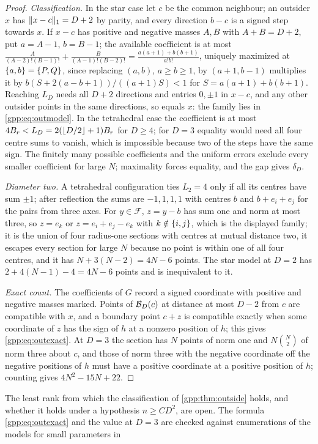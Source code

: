 \begin{proof}
\emph{Classification.} In the star case let $c$ be the common neighbour; an outsider $x$
has $\lVert x-c\rVert_1=D+2$ by parity, and every direction $b-c$ is a signed step towards $x$.
If $x-c$ has positive and negative masses $A,B$ with $A+B=D+2$, put $a=A-1$, $b=B-1$; the
available coefficient is at most $\frac A{(A-2)!(B-1)!}+\frac B{(A-1)!(B-2)!}
=\frac{a(a+1)+b(b+1)}{a!b!}$, uniquely maximized at $\{a,b\}=\{P,Q\}$, since replacing
$(a,b)$, $a\ge b\ge1$, by $(a+1,b-1)$ multiplies it by $b(S+2(a-b+1))/((a+1)S)<1$ for
$S=a(a+1)+b(b+1)$. Reaching $L_D$ needs all $D+2$ directions and entries $0,\pm1$ in $x-c$,
and any other outsider points in the same directions, so equals $x$: the family lies in
\eqref{gpp:eq:outmodel}. In the tetrahedral case the coefficient is at most
$4B_r<L_D=2(\lfloor D/2\rfloor+1)B_r$ for $D\ge4$; for $D=3$ equality would need all four centre
sums to vanish, which is impossible because two of the steps have the same sign. The finitely
many possible coefficients and the uniform errors exclude every smaller coefficient for
large $N$; maximality forces equality, and the gap gives $\delta_D$.

\emph{Diameter two.} A tetrahedral configuration ties $L_2=4$ only if all its centres have
sum $\pm1$; after reflection the sums are $-1,1,1,1$ with centres $b$ and $b+e_i+e_j$ for the
pairs from three axes. For $y\in\mathcal F$, $z=y-b$ has sum one and norm at most three, so
$z=e_k$ or $z=e_i+e_j-e_k$ with $k\notin\{i,j\}$, which is the displayed family; it is the
union of four radius-one sections with centres at mutual distance two, it escapes every
section for large $N$ because no point is within one of all four centres, and it has
$N+3(N-2)=4N-6$ points. The star model at $D=2$ has $2+4(N-1)-4=4N-6$ points and is
inequivalent to it.

\emph{Exact count.} The coefficients of $G$ record a signed coordinate with positive and
negative masses marked. Points of $\mathcal{B}_D(c)$ at distance at most $D-2$ from $c$ are
compatible with $x$, and a boundary point $c+z$ is compatible exactly when some coordinate
of $z$ has the sign of $h$ at a nonzero position of $h$; this gives
\eqref{gpp:eq:outexact}. At $D=3$ the section has $N$ points of norm one and $N\binom N2$ of
norm three about $c$, and those of norm three with the negative coordinate off the
negative positions of $h$ must have a positive coordinate at a positive position of $h$;
counting gives $4N^2-15N+22$.
\end{proof}

The least rank from which the classification of \cref{gpp:thm:outside} holds, and whether
it holds under a hypothesis $n\ge CD^2$, are open. The formula \eqref{gpp:eq:outexact} and
the value at $D=3$ are checked against enumerations of the models for small parameters in

